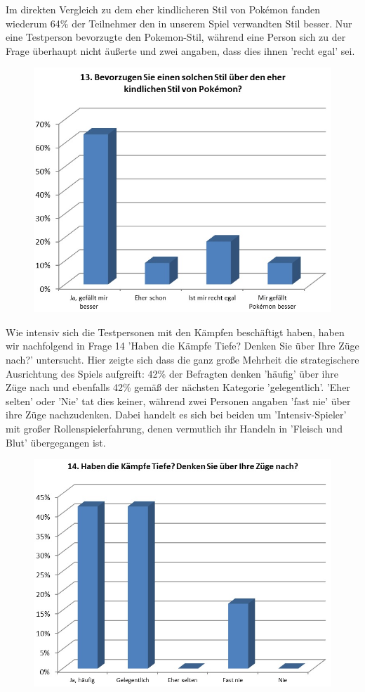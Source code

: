 \documentclass[extern,palatino]{cgBA}
\begin{document}
Im direkten Vergleich zu dem eher kindlicheren Stil von Pokémon fanden wiederum 64\% der Teilnehmer den in unserem Spiel verwandten Stil besser. Nur eine Testperson bevorzugte den Pokemon-Stil, während eine Person sich zu der Frage überhaupt nicht äußerte und zwei angaben, dass dies ihnen 'recht egal' sei. 
\begin{figure}[H]
	\centering
	\includegraphics[width=1\textwidth]{table11.jpg}
\end{figure}
Wie intensiv sich die Testpersonen mit den Kämpfen beschäftigt haben, haben wir nachfolgend in Frage 14 'Haben die Kämpfe Tiefe? Denken Sie über Ihre Züge nach?' untersucht. Hier zeigte sich dass die ganz große Mehrheit die strategischere Ausrichtung des Spiels aufgreift: 42\% der Befragten denken 'häufig' über ihre Züge nach und ebenfalls 42\% gemäß der nächsten Kategorie 'gelegentlich'. 'Eher selten' oder 'Nie' tat dies keiner, während zwei Personen angaben 'fast nie' über ihre Züge nachzudenken. Dabei handelt es sich bei beiden um 'Intensiv-Spieler' mit großer Rollenspielerfahrung, denen vermutlich ihr Handeln in 'Fleisch und Blut' übergegangen ist. 
\begin{figure}[H]
	\centering
	\includegraphics[width=1\textwidth]{table12.jpg}
\end{figure}
\end{document}
